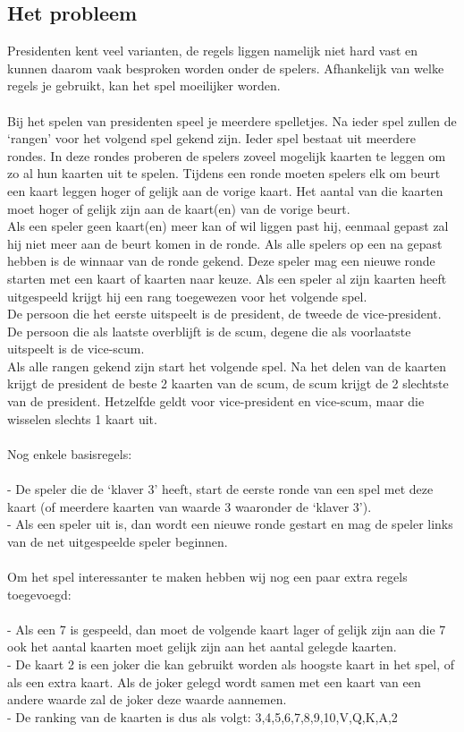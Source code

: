 \documentclass[11pt]{article}
\begin{document}
\subsection{Het probleem}
Presidenten kent veel varianten, de regels liggen namelijk niet hard vast en kunnen daarom vaak besproken worden onder de spelers. Afhankelijk van welke regels je gebruikt, kan het spel moeilijker worden. \\\\
Bij het spelen van presidenten speel je meerdere spelletjes. Na ieder spel zullen de `rangen' voor het volgend spel gekend zijn. Ieder spel bestaat uit meerdere rondes. In deze rondes proberen de spelers zoveel mogelijk kaarten te leggen om zo al hun kaarten uit te spelen. Tijdens een ronde moeten spelers elk om beurt een kaart leggen hoger of gelijk aan de vorige kaart. Het aantal van die kaarten moet hoger of gelijk zijn aan de kaart(en) van de vorige beurt.\\
Als een speler geen kaart(en) meer kan of wil liggen past hij, eenmaal gepast zal hij niet meer aan de beurt komen in de ronde. Als alle spelers op een na gepast hebben is de winnaar van de ronde gekend. Deze speler mag een nieuwe ronde starten met een kaart of kaarten naar keuze. Als een speler al zijn kaarten heeft uitgespeeld krijgt hij een rang toegewezen voor het volgende spel.\\
De persoon die het eerste uitspeelt is de president, de tweede de vice-president.
De persoon die als laatste overblijft is de scum, degene die als voorlaatste uitspeelt is de vice-scum.\\
Als alle rangen gekend zijn start het volgende spel. Na het delen van de kaarten krijgt de president de beste 2 kaarten van de scum, de scum krijgt de 2 slechtste van de president. Hetzelfde geldt voor vice-president en vice-scum, maar die wisselen slechts 1 kaart uit.\\\\
Nog enkele basisregels:\\\\
- De speler die de ‘klaver 3’ heeft, start de eerste ronde van een spel met deze kaart (of meerdere kaarten van waarde 3 waaronder de `klaver 3'). \\
- Als een speler uit is, dan wordt een nieuwe ronde gestart en mag de speler links van de net uitgespeelde speler beginnen.\\\\
Om het spel interessanter te maken hebben wij nog een paar extra regels toegevoegd:\\\\
- Als een 7 is gespeeld, dan moet de volgende kaart lager of gelijk zijn aan die 7 ook het aantal kaarten moet gelijk zijn aan het aantal gelegde kaarten.\\
- De kaart 2 is een joker die kan gebruikt worden als hoogste kaart in het spel, of als een extra kaart. Als de joker gelegd wordt samen met een kaart van een andere waarde zal de joker deze waarde aannemen.\\
- De ranking van de kaarten is dus als volgt: 3,4,5,6,7,8,9,10,V,Q,K,A,2\\
\end{document}
